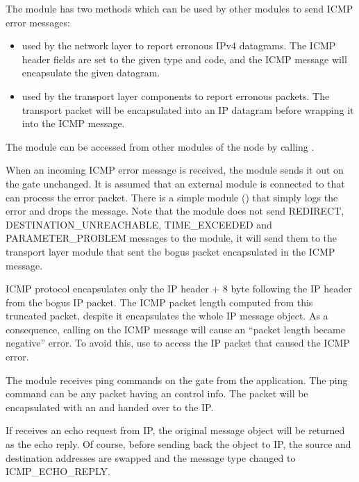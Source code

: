 The  module has two methods which can be used by other modules
to send ICMP error messages:
\begin{itemize}
  \item {}
        used by the network layer to report erronous IPv4 datagrams. The ICMP header
        fields are set to the given type and code, and the ICMP message will encapsulate
        the given datagram.
  \item {}
        used by the transport layer components to report erronous packets. The transport
        packet will be encapsulated into an IP datagram before wrapping it into the ICMP message.
\end{itemize}

The  module can be accessed from other modules of the node by calling
.

When an incoming ICMP error message is received, the  module
sends it out on the  gate unchanged. It is assumed that an
external module is connected to  that can process the error
packet. There is a simple module () that simply
logs the error and drops the message. Note that the  module
does not send REDIRECT, DESTINATION\_UNREACHABLE,
TIME\_EXCEEDED and PARAMETER\_PROBLEM messages to the  module,
it will send them to the transport layer module that sent the bogus
packet encapsulated in the ICMP message.
\begin{note}
ICMP protocol encapsulates only the IP header + 8 byte following the IP header
from the bogus IP packet. The ICMP packet length computed from this truncated
packet, despite it encapsulates the whole IP message object.
As a consequence, calling  on the ICMP message
will cause an ``packet length became negative'' error. To avoid this,
use  to access the IP packet that caused the ICMP
error. 
\end{note}

The  module receives ping commands on the 
gate from the application. The ping command can be any packet
having an  control info. The packet
will be encapsulated with an  and
handed over to the IP.

If  receives an echo request from IP, the original
message object will be returned as the echo reply. Of course,
before sending back the object to IP, the source and destination
addresses are swapped and the message type changed to ICMP\_ECHO\_REPLY.

